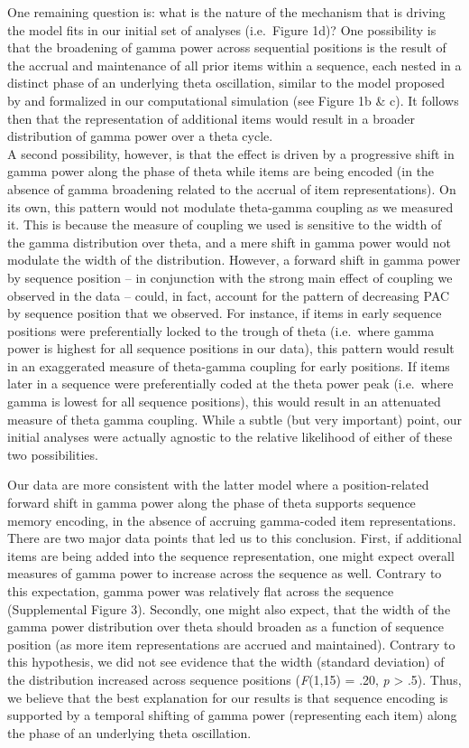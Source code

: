 One remaining question is: what is the nature of the mechanism that is
driving the model fits in our initial set of analyses (i.e.~Figure 1d)?
One possibility is that the broadening of gamma power across sequential
positions is the result of the accrual and maintenance of all prior
items within a sequence, each nested in a distinct phase of an
underlying theta oscillation, similar to the model proposed by
\textcite{lisman_storage_1995} and formalized in our computational
simulation (see Figure 1b \& c). It follows then that the representation
of additional items would result in a broader distribution of gamma
power over a theta cycle.\\
A second possibility, however, is that the effect is driven by a
progressive shift in gamma power along the phase of theta while items
are being encoded (in the absence of gamma broadening related to the
accrual of item representations). On its own, this pattern would not
modulate theta-gamma coupling as we measured it. This is because the
measure of coupling we used is sensitive to the width of the gamma
distribution over theta, and a mere shift in gamma power would not
modulate the width of the distribution. However, a forward shift in
gamma power by sequence position -- in conjunction with the strong main
effect of coupling we observed in the data -- could, in fact, account
for the pattern of decreasing PAC by sequence position that we observed.
For instance, if items in early sequence positions were preferentially
locked to the trough of theta (i.e.~where gamma power is highest for all
sequence positions in our data), this pattern would result in an
exaggerated measure of theta-gamma coupling for early positions. If
items later in a sequence were preferentially coded at the theta power
peak (i.e.~where gamma is lowest for all sequence positions), this would
result in an attenuated measure of theta gamma coupling. While a subtle
(but very important) point, our initial analyses were actually agnostic
to the relative likelihood of either of these two possibilities.

Our data are more consistent with the latter model where a
position-related forward shift in gamma power along the phase of theta
supports sequence memory encoding, in the absence of accruing
gamma-coded item representations. There are two major data points that
led us to this conclusion. First, if additional items are being added
into the sequence representation, one might expect overall measures of
gamma power to increase across the sequence as well. Contrary to this
expectation, gamma power was relatively flat across the sequence
(Supplemental Figure 3). Secondly, one might also expect, that the width
of the gamma power distribution over theta should broaden as a function
of sequence position (as more item representations are accrued and
maintained). Contrary to this hypothesis, we did not see evidence that
the width (standard deviation) of the distribution increased across
sequence positions (\emph{F}(1,15) = .20, \emph{p} \textgreater{} .5).
Thus, we believe that the best explanation for our results is that
sequence encoding is supported by a temporal shifting of gamma power
(representing each item) along the phase of an underlying theta
oscillation.

